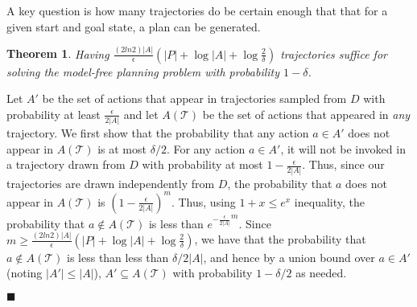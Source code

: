 \documentclass[letterpaper]{article}
\newenvironment{proof}{\noindent{\bf Proof:~~}}{\qed}
\newcommand{\qed}{\hfill\ensuremath{\blacksquare}}
\newtheorem{theorem}{Theorem}
\begin{document}
A key question is how many trajectories do be certain enough that that for a given start and goal state, a  plan can be generated. 
\begin{theorem}
Having $\frac{(2ln 2)|A|}{\epsilon}(|P|+\log |A|+\log\frac{2}{\delta})$ trajectories suffice for solving the model-free planning problem
with probability $1-\delta$. 
\end{theorem}
\begin{proof}
Let $A'$ be the set of actions that appear in trajectories sampled from $D$ with probability at least $\frac{\epsilon}{2|A|}$%
and let $A(\mathcal{T})$ be the set of actions that appeared in {\em any} trajectory. 
We first show that the probability that any action $a\in A'$ does not appear in $A(\mathcal{T})$ is at most $\delta/2$. For any action $a\in A'$, it will not be invoked in a trajectory drawn from $D$ with probability at most $1-\frac{\epsilon}{2|A|}$. 
Thus, since our trajectories are drawn independently from $D$, the probability that $a$ does not appear in $A(\mathcal{T})$ 
is $(1-\frac{\epsilon}{2|A|})^m$. Thus, using $1+x\leq e^x$ inequality, the probability that $a\notin A(\mathcal{T})$ is less than 
${e^{-\frac{\epsilon}{2|A|}}}^m$. 
Since $m\geq \frac{(2ln 2)|A|}{\epsilon}(|P|+\log |A|+\log\frac{2}{\delta})$, we have that the probability that $a\notin A(\mathcal{T})$ is less than less than $\delta/2|A|$, and hence by a union bound over $a\in A'$ (noting $|A'|\leq |A|$), $A'\subseteq A(\mathcal{T})$ with probability $1-\delta/2$ as needed.




\end{proof}
\end{document}
